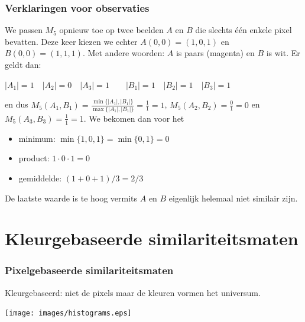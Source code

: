 \documentclass[dutch]{beamer}
\theoremstyle{definition}
\theoremstyle{remark}
\theoremstyle{example}
\begin{document}
\frame
{
  \frametitle{Verklaringen voor observaties}
  
  We passen $M_5$ opnieuw toe op twee beelden $A$ en $B$ die slechts \'e\'en enkele pixel 
  bevatten. Deze keer kiezen we echter $A(0,0)=(1,0,1)$ en $B(0,0)=(1,1,1)$. Met 
  andere woorden: $A$ is {\color{mymagenta} paars (magenta)} en $B$ is {\color{white} wit}. Er geldt dan:
  \begin{minipage}{\textwidth}
  \vspace{4pt}
  \small
  \centering
  $|A_1|=1 \quad |A_2|=0 \quad |A_3|=1 \qquad |B_1|=1 \quad |B_2|=1 \quad |B_3|=1$
  \vspace{4pt}
  \end{minipage}
  en dus
  $M_5(A_1,B_1)=\frac{\min\{|A_1|,|B_1|\}}{\max\{|A_1|,|B_1|\}}=\frac{1}{1}=1$, 
  $M_5(A_2,B_2)=\frac{0}{1}=0$ {\normalsize en} $M_5(A_3,B_3)=\frac{1}{1}=1$.
  We bekomen dan voor het
  \begin{itemize}
    \item minimum: $\min\{1,0,1\}=\min\{0,1\}=0$
    \item product: $1 \cdot 0 \cdot 1 = 0$
    \item gemiddelde: $(1+0+1)/3=2/3$
  \end{itemize}
  De laatste waarde is te hoog vermits $A$ en $B$ eigenlijk helemaal niet 
  similair zijn.
}

\section{Kleurgebaseerde similariteitsmaten}
\frame
{
  \frametitle{Pixelgebaseerde similariteitsmaten}

  Kleurgebaseerd: niet de pixels maar de kleuren vormen het universum.

  \begin{center}
  \texttt{[image: images/histograms.eps]}
  \end{center}
}
\end{document}
